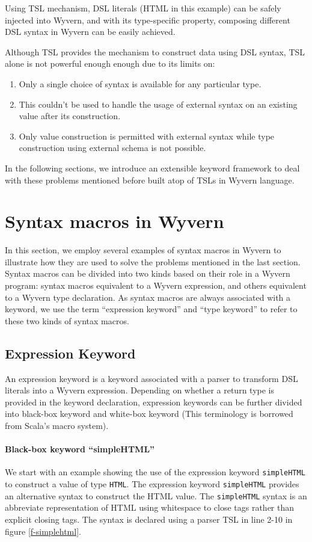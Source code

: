 \documentclass{sig-alternate}
\begin{document}
Using TSL mechanism, DSL literals (HTML in this example) can be safely injected into Wyvern, and with its type-specific property, composing different DSL syntax in Wyvern can be easily achieved. 

Although TSL provides the mechanism to construct data using DSL syntax, TSL alone is not powerful enough enough due to its limits on: 
\begin{enumerate}\setlength{\itemsep}{0pt}
\item Only a single choice of syntax is available for any particular type.
\item This couldn't be used to handle the usage of external syntax on an existing value after its construction.
\item Only value construction is permitted with external syntax while type construction using external schema is not possible.
\end{enumerate}

In the following sections, we introduce an extensible keyword framework to deal with these problems mentioned before built atop of TSLs in Wyvern language. 

\section{Syntax macros in Wyvern}
In this section, we employ several examples of syntax macros in Wyvern to illustrate how they are used to solve the problems mentioned in the last section. Syntax macros can be divided into two kinds based on their role in a Wyvern program: syntax macros equivalent to a Wyvern expression, and others equivalent to a Wyvern type declaration. As syntax macros are always associated with a keyword, we use the term ``expression keyword'' and ``type keyword'' to refer to these two kinds of syntax macros.

\subsection{Expression Keyword}
An expression keyword is a keyword associated with a parser to transform DSL literals into a Wyvern expression. Depending on whether a return type is provided in the keyword declaration, expression keywords can be further divided into black-box keyword and white-box keyword (This terminology is borrowed from Scala's macro system). 

\paragraph{Black-box keyword ``simpleHTML''}
We start with an example showing the use of the expression keyword \verb|simpleHTML| to construct a value of type \verb|HTML|. The expression keyword \verb|simpleHTML| provides an alternative syntax to construct the HTML value. The \verb|simpleHTML| syntax is an abbreviate representation of HTML using whitespace to close tags rather than explicit closing tags. The syntax is declared using a parser TSL in line 2-10 in figure \ref{f-simplehtml}.
\end{document}
